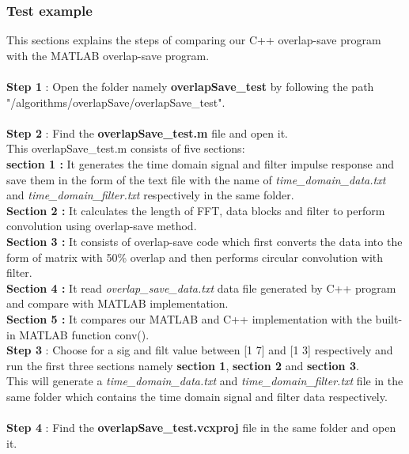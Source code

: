 \subsubsection{Test example}
This sections explains the steps of comparing our C++ overlap-save program with the MATLAB overlap-save program.\\ \\
\textbf{Step 1} : Open the folder namely \textbf{overlapSave\_test} by following the path  "/algorithms/overlapSave/overlapSave\_test".\\ \\
\textbf{Step 2} : Find the \textbf{overlapSave\_test.m} file and open it.\\
This overlapSave\_test.m consists of five sections:\\
\textbf{section 1 :} It generates the time domain signal and filter impulse response  and save them in the form of the text file with the name of \textit{time\_domain\_data.txt} and \textit{time\_domain\_filter.txt} respectively in the same folder.\\
\textbf{Section 2 :} It calculates the length of FFT, data blocks and filter to perform convolution using overlap-save method.\\
\textbf{Section 3 :} It consists of overlap-save code which first converts the data into the form of matrix with 50\% overlap and then performs circular convolution with filter.\\
\textbf{Section 4 :} It read \textit{overlap\_save\_data.txt} data file generated by C++ program and compare with MATLAB implementation. \\
\textbf{Section 5 :} It compares our MATLAB and C++ implementation with the built-in MATLAB function conv(). \\ 

\textbf{Step 3} : Choose for a sig and filt value between [1 7] and [1 3] respectively and run the first three sections namely \textbf{section 1}, \textbf{section 2} and \textbf{section 3}.\\
This will generate a \textit{time\_domain\_data.txt} and \textit{time\_domain\_filter.txt} file in the same folder which contains the time domain signal and filter data respectively.\\ \\
\textbf{Step 4} : Find the \textbf{overlapSave\_test.vcxproj} file in the same folder and open it.\\
